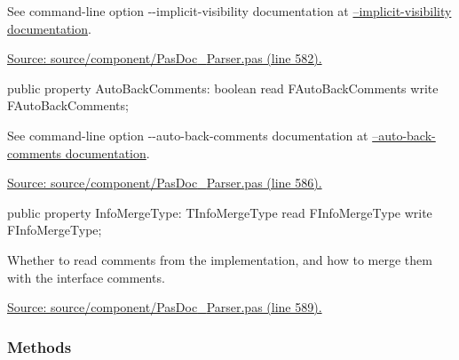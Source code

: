 \documentclass{report}
\newif\ifpdf
\begin{document}
\begin{list}{}
\begin{flushleft}
\ifpdf
\end{flushleft}
\fi


\par See command{-}line option {-}{-}implicit{-}visibility documentation at \href{https://pasdoc.github.io/ImplicitVisibilityOption}{--implicit-visibility documentation}.\par
\href{https://github.com/pasdoc/pasdoc/blob/master/source/component/PasDoc_Parser.pas#L582}{Source: source/component/PasDoc{\_}Parser.pas (line 582).}\label{PasDoc_Parser.TParser-AutoBackComments}
\item[\textbf{AutoBackComments}\hfill]
\ifpdf
\begin{flushleft}
\fi
\begin{ttfamily}
public property AutoBackComments: boolean read FAutoBackComments write FAutoBackComments;\end{ttfamily}

\ifpdf
\end{flushleft}
\fi


\par See command{-}line option {-}{-}auto{-}back{-}comments documentation at \href{https://pasdoc.github.io/AutoBackComments}{--auto-back-comments documentation}.\par
\href{https://github.com/pasdoc/pasdoc/blob/master/source/component/PasDoc_Parser.pas#L586}{Source: source/component/PasDoc{\_}Parser.pas (line 586).}\label{PasDoc_Parser.TParser-InfoMergeType}
\item[\textbf{InfoMergeType}\hfill]
\ifpdf
\begin{flushleft}
\fi
\begin{ttfamily}
public property InfoMergeType: TInfoMergeType read FInfoMergeType write FInfoMergeType;\end{ttfamily}

\ifpdf
\end{flushleft}
\fi


\par Whether to read comments from the implementation, and how to merge them with the interface comments.\par
\href{https://github.com/pasdoc/pasdoc/blob/master/source/component/PasDoc_Parser.pas#L589}{Source: source/component/PasDoc{\_}Parser.pas (line 589).}\end{list}
\subsubsection*{\large{\textbf{Methods}}\normalsize\hspace{1ex}\hfill}
\end{document}

